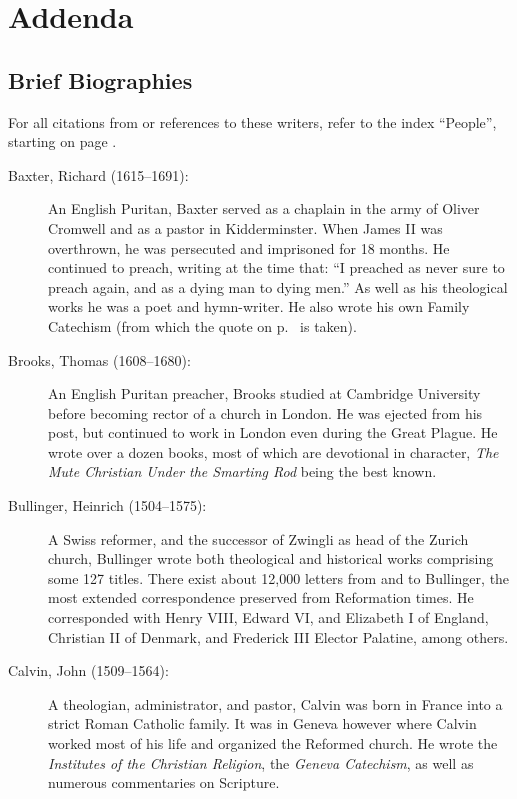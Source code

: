\documentclass[00-main.tex]{subfiles}
\begin{document}
	
\backmatter

\pagestyle{myPlainStyle}

\part{Addenda}

\chapter{Brief Biographies}

For all citations from or references to these writers, refer to the index ``People'', starting on page \pageref{ind:people}.

\begin{description}
	\item[Baxter, Richard (1615--1691):]\label{baxter} An English Puritan, Baxter served as a chaplain in the army of Oliver Cromwell and as a pastor in Kidderminster. When James II was overthrown, he was persecuted and imprisoned for 18 months. He continued to preach, writing at the time that: ``I preached as never sure to preach again, and as a dying man to dying men.'' As well as his theological works he was a poet and hymn-writer. He also wrote his own Family Catechism (from which the quote on p.~\pageref{baxter:q3} is taken).
	
	\item[Brooks, Thomas (1608--1680):]\label{brooks} An English Puritan preacher, Brooks studied at Cambridge University before becoming rector of a church in London. He was ejected from his post, but continued to work in London even during the Great Plague. He wrote over a dozen books, most of which are devotional in character, \emph{The Mute Christian Under the Smarting Rod\/} being the best known.
	
	\item[Bullinger, Heinrich (1504--1575):]\label{bullinger} A Swiss reformer, and the successor of Zwingli as head of the Zurich church, Bullinger wrote both theological and historical works comprising some 127 titles. There exist about 12,000 letters from and to Bullinger, the most extended correspondence preserved from Reformation times. He corresponded with Henry VIII, Edward VI, and Elizabeth I of England, Christian II of Denmark, and Frederick III Elector Palatine, among others.
	
	\item[Calvin, John (1509--1564):]\label{calvin} A theologian, administrator, and pastor, Cal\-vin was born in France into a strict Roman Catholic family. It was in Geneva however where Calvin worked most of his life and organized the Reformed church. He wrote the \emph{Institutes of the Christian Religion}, the \emph{Geneva Catechism}, as well as numerous commentaries on Scripture.
	

\end{description}
\end{document}
